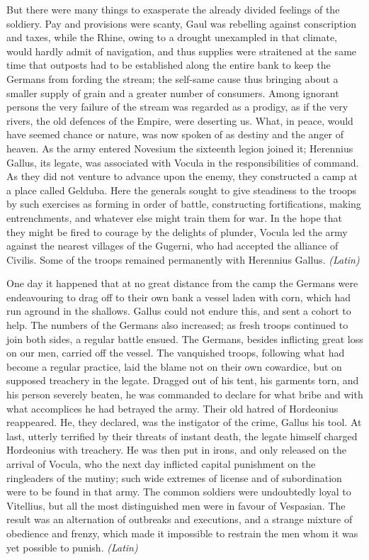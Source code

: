But there were many things to exasperate the already divided feelings of the soldiery. Pay and provisions were scanty, Gaul was rebelling against conscription and taxes, while the Rhine, owing to a drought unexampled in that climate, would hardly admit of navigation, and thus supplies were straitened at the same time that outposts had to be established along the entire bank to keep the Germans from fording the stream; the self-same cause thus bringing about a smaller supply of grain and a greater number of consumers. Among ignorant persons the very failure of the stream was regarded as a prodigy, as if the very rivers, the old defences of the Empire, were deserting us. What, in peace, would have seemed chance or nature, was now spoken of as destiny and the anger of heaven. As the army entered Novesium the sixteenth legion joined it; Herennius Gallus, its legate, was associated with Vocula in the responsibilities of command. As they did not venture to advance upon the enemy, they constructed a camp at a place called Gelduba. Here the generals sought to give steadiness to the troops by such exercises as forming in order of battle, constructing fortifications, making entrenchments, and whatever else might train them for war. In the hope that they might be fired to courage by the delights of plunder, Vocula led the army against the nearest villages of the Gugerni, who had accepted the alliance of Civilis. Some of the troops remained permanently with Herennius Gallus. \emph{(Latin)}


One day it happened that at no great distance from the camp the Germans were endeavouring to drag off to their own bank a vessel laden with corn, which had run aground in the shallows. Gallus could not endure this, and sent a cohort to help. The numbers of the Germans also increased; as fresh troops continued to join both sides, a regular battle ensued. The Germans, besides inflicting great loss on our men, carried off the vessel. The vanquished troops, following what had become a regular practice, laid the blame not on their own cowardice, but on supposed treachery in the legate. Dragged out of his tent, his garments torn, and his person severely beaten, he was commanded to declare for what bribe and with what accomplices he had betrayed the army. Their old hatred of Hordeonius reappeared. He, they declared, was the instigator of the crime, Gallus his tool. At last, utterly terrified by their threats of instant death, the legate himself charged Hordeonius with treachery. He was then put in irons, and only released on the arrival of Vocula, who the next day inflicted capital punishment on the ringleaders of the mutiny; such wide extremes of license and of subordination were to be found in that army. The common soldiers were undoubtedly loyal to Vitellius, but all the most distinguished men were in favour of Vespasian. The result was an alternation of outbreaks and executions, and a strange mixture of obedience and frenzy, which made it impossible to restrain the men whom it was yet possible to punish. \emph{(Latin)}

